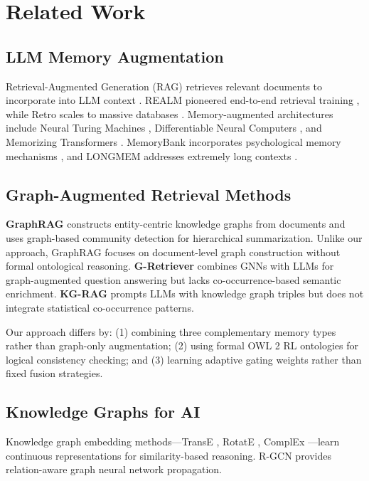 \documentclass[conference]{IEEEtran}
\begin{document}
\section{Related Work}

\subsection{LLM Memory Augmentation}

Retrieval-Augmented Generation (RAG) retrieves relevant documents to incorporate into LLM context \cite{lewis2020retrieval}. REALM pioneered end-to-end retrieval training \cite{guu2020retrieval}, while Retro scales to massive databases \cite{borgeaud2022improving}. Memory-augmented architectures include Neural Turing Machines \cite{graves2014neural}, Differentiable Neural Computers \cite{graves2016hybrid}, and Memorizing Transformers \cite{wu2022memorizing}. MemoryBank incorporates psychological memory mechanisms \cite{zhong2023memorybank}, and LONGMEM addresses extremely long contexts \cite{wang2023longmem}.

\subsection{Graph-Augmented Retrieval Methods}
\label{sec:graphrag}

\textbf{GraphRAG} \cite{edge2024graphrag} constructs entity-centric knowledge graphs from documents and uses graph-based community detection for hierarchical summarization. Unlike our approach, GraphRAG focuses on document-level graph construction without formal ontological reasoning. \textbf{G-Retriever} \cite{he2024gretriever} combines GNNs with LLMs for graph-augmented question answering but lacks co-occurrence-based semantic enrichment. \textbf{KG-RAG} \cite{baek2023knowledge} prompts LLMs with knowledge graph triples but does not integrate statistical co-occurrence patterns.

Our approach differs by: (1) combining three complementary memory types rather than graph-only augmentation; (2) using formal OWL 2 RL ontologies for logical consistency checking; and (3) learning adaptive gating weights rather than fixed fusion strategies.

\subsection{Knowledge Graphs for AI}

Knowledge graph embedding methods---TransE \cite{bordes2013translating}, RotatE \cite{sun2019rotate}, ComplEx \cite{trouillon2016complex}---learn continuous representations for similarity-based reasoning. R-GCN \cite{schlichtkrull2018modeling} provides relation-aware graph neural network propagation.
\end{document}
